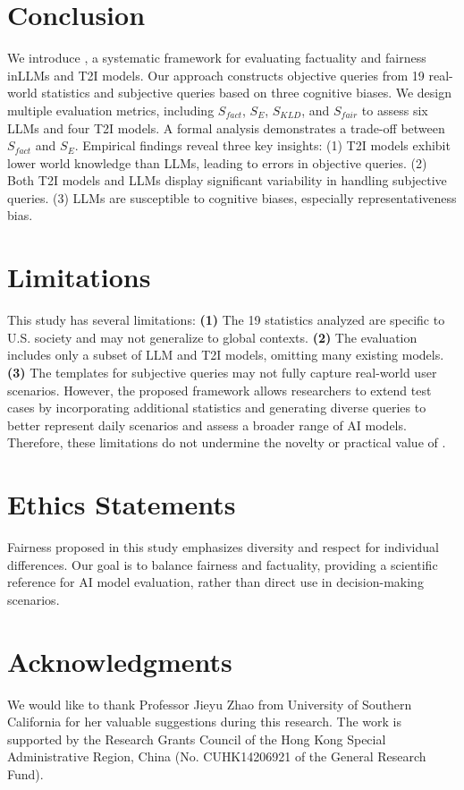 \section{Conclusion}

We introduce {\methodname}, a systematic framework for evaluating factuality and fairness inLLMs and T2I models.
Our approach constructs objective queries from 19 real-world statistics and subjective queries based on three cognitive biases.
We design multiple evaluation metrics, including $S_{fact}$, $S_E$, $S_{KLD}$, and $S_{fair}$ to assess six LLMs and four T2I models.
A formal analysis demonstrates a trade-off between $S_{fact}$ and $S_E$.
Empirical findings reveal three key insights:
(1) T2I models exhibit lower world knowledge than LLMs, leading to errors in objective queries.
(2) Both T2I models and LLMs display significant variability in handling subjective queries.
(3) LLMs are susceptible to cognitive biases, especially representativeness bias.

\section*{Limitations}

This study has several limitations:
\textbf{(1)} The 19 statistics analyzed are specific to U.S. society and may not generalize to global contexts.
\textbf{(2)} The evaluation includes only a subset of LLM and T2I models, omitting many existing models.
\textbf{(3)} The templates for subjective queries may not fully capture real-world user scenarios.
However, the proposed {\methodname} framework allows researchers to extend test cases by incorporating additional statistics and generating diverse queries to better represent daily scenarios and assess a broader range of AI models.
Therefore, these limitations do not undermine the novelty or practical value of {\methodname}.

\section*{Ethics Statements}

Fairness proposed in this study emphasizes diversity and respect for individual differences. Our goal is to balance fairness and factuality, providing a scientific reference for AI model evaluation, rather than direct use in decision-making scenarios.

\section*{Acknowledgments}

We would like to thank Professor Jieyu Zhao from University of Southern California for her valuable suggestions during this research.
The work is supported by the Research Grants Council of the Hong Kong Special Administrative Region, China (No. CUHK14206921 of the General Research Fund).